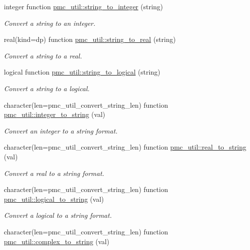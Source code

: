 \begin{DoxyCompactItemize}
integer function \mbox{\hyperlink{namespacepmc__util_aa4e6c3a50b7def19b9ce4cf85a0816ca}{pmc\+\_\+util\+::string\+\_\+to\+\_\+integer}} (string)
\begin{DoxyCompactList}\small\item\em Convert a string to an integer. \end{DoxyCompactList}\item 
real(kind=dp) function \mbox{\hyperlink{namespacepmc__util_a1d18d4c7adea4978d104517da57995ef}{pmc\+\_\+util\+::string\+\_\+to\+\_\+real}} (string)
\begin{DoxyCompactList}\small\item\em Convert a string to a real. \end{DoxyCompactList}\item 
logical function \mbox{\hyperlink{namespacepmc__util_addbacdfdd34c9190924403097f717ab4}{pmc\+\_\+util\+::string\+\_\+to\+\_\+logical}} (string)
\begin{DoxyCompactList}\small\item\em Convert a string to a logical. \end{DoxyCompactList}\item 
character(len=pmc\+\_\+util\+\_\+convert\+\_\+string\+\_\+len) function \mbox{\hyperlink{namespacepmc__util_ab5a72413552c4a653ddafc47e28a2f14}{pmc\+\_\+util\+::integer\+\_\+to\+\_\+string}} (val)
\begin{DoxyCompactList}\small\item\em Convert an integer to a string format. \end{DoxyCompactList}\item 
character(len=pmc\+\_\+util\+\_\+convert\+\_\+string\+\_\+len) function \mbox{\hyperlink{namespacepmc__util_a5f80ccbbb2709c6f8458a1f7742aa549}{pmc\+\_\+util\+::real\+\_\+to\+\_\+string}} (val)
\begin{DoxyCompactList}\small\item\em Convert a real to a string format. \end{DoxyCompactList}\item 
character(len=pmc\+\_\+util\+\_\+convert\+\_\+string\+\_\+len) function \mbox{\hyperlink{namespacepmc__util_a92e778281860ee189704e0f1f2c19e86}{pmc\+\_\+util\+::logical\+\_\+to\+\_\+string}} (val)
\begin{DoxyCompactList}\small\item\em Convert a logical to a string format. \end{DoxyCompactList}\item 
character(len=pmc\+\_\+util\+\_\+convert\+\_\+string\+\_\+len) function \mbox{\hyperlink{namespacepmc__util_a1c459fd59d9acef65849cc5fd388d386}{pmc\+\_\+util\+::complex\+\_\+to\+\_\+string}} (val)

\end{DoxyCompactItemize}
